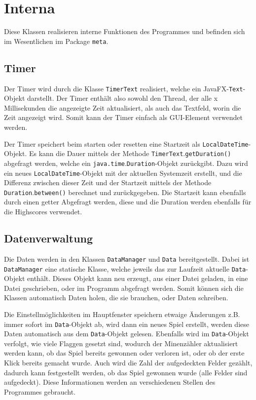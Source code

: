 \documentclass[oneside,12pt]{scrartcl}
\newcommand*{\EnableHyphenationInTexttt}{\hyphenchar\font=45\relax}%
\newcommand{\class}[1]{\textcolor{Green4}{\bcode{#1}}}
\newcommand{\package}[1]{Package \npackage{#1}}
\newcommand{\npackage}[1]{\textcolor{Blue4}{\bcode{#1}}}
\newcommand{\fullclass}[2]{\npackage{#1}.\class{#2}}
\newcommand{\method}[1]{\textcolor{Orange3}{\bcode{#1()}}}
\newcommand{\methodcall}[2]{\class{#1}.\method{#2}}
\newcommand{\bcode}[1]{\texttt{\EnableHyphenationInTexttt#1}}
\begin{document}
\section{Interna}
Diese Klassen realisieren interne Funktionen des Programmes und befinden sich im Wesentlichen im \package{meta}.

\subsection{Timer}
Der Timer wird durch die Klasse \class{TimerText} realisiert, welche ein JavaFX-\class{Text}-Objekt darstellt. Der Timer enthält also sowohl den Thread, der alle x Millisekunden die angezeigte Zeit aktualisiert, als auch das Textfeld, worin die Zeit angezeigt wird. Somit kann der Timer einfach als GUI-Element verwendet werden.

Der Timer speichert beim starten oder resetten eine Startzeit als \class{LocalDateTime}-Objekt. Es kann die Dauer mittels der Methode \methodcall{TimerText}{getDuration} abgefragt werden, welche ein \fullclass{java.time}{Duration}-Objekt zurückgibt. Dazu wird ein neues \class{LocalDateTime}-Objekt mit der aktuellen Systemzeit erstellt, und die Differenz zwischen dieser Zeit und der Startzeit mittels der Methode \methodcall{Duration}{between} berechnet und zurückgegeben. Die Startzeit kann ebenfalls durch einen getter Abgefragt werden, diese und die Duration werden ebenfalls für die Highscores verwendet.

\subsection{Datenverwaltung}
\label{sec:Datenverwaltung}
Die Daten werden in den Klassen \class{DataManager} und \class{Data} bereitgestellt. Dabei ist \class{DataManager} eine statische Klasse, welche jeweils das zur Laufzeit aktuelle \class{Data}-Objekt enthält. Dieses Objekt kann neu erzeugt, aus einer Datei geladen, in eine Datei geschrieben, oder im Programm abgefragt werden. Somit können sich die Klassen automatisch Daten holen, die sie brauchen, oder Daten schreiben.

Die Einstellmöglichkeiten im Hauptfenster speichern etwaige Änderungen z.B. immer sofort im \class{Data}-Objekt ab, wird dann ein neues Spiel erstellt, werden diese Daten automatisch aus dem \class{Data}-Objekt gelesen. Ebenfalls wird im \class{Data}-Objekt verfolgt, wie viele Flaggen gesetzt sind, wodurch der Minenzähler aktualisiert werden kann, ob das Spiel bereits gewonnen oder verloren ist, oder ob der erste Klick bereits gemacht wurde. Auch wird die Zahl der aufgedeckten Felder gezählt, dadurch kann festgestellt werden, ob das Spiel gewonnen wurde (alle Felder sind aufgedeckt). Diese Informationen werden an verschiedenen Stellen des Programmes gebraucht.
\end{document}
